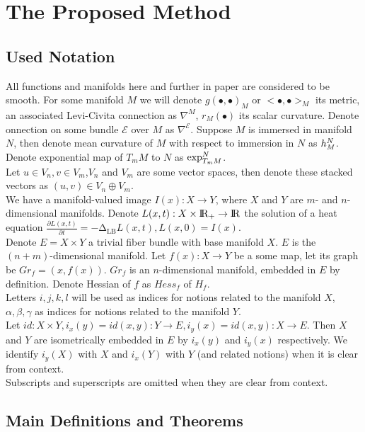 \documentclass{llncs}
\newcommand{\LaplaceBeltrami}{\mathrm{\Delta_{{LB}}}}
\newcommand{\partderiv}[2]{\frac{\partial #1}{\partial #2}}
\newcommand{\toreal}{\rightarrow\bbbr}
\newcommand{\CovariantDiffManif}[1]{\nabla^{#1}}
\newcommand{\TangentSpaceArg}[2]{{T_{#2}}{#1}}
\newcommand {\bigeps}{\mathcal{E}}
\begin{document}
\section{The Proposed Method}
\subsection{Used Notation}
All functions and manifolds here and further in paper are considered to be smooth. For some manifold $M$ we will denote $g(∙,∙)_{M}$ or $<∙,∙>_{M}$ its metric, an associated Levi-Civita connection as $\CovariantDiffManif{M}$, $r_M(∙)$ its scalar curvature. Denote onnection on some bundle $\bigeps$ over $M$ as $\CovariantDiffManif{\bigeps}$. Suppose $M$ is immersed in manifold $N$, then denote mean curvature of $M$ with respect to immersion in $N$ as $\tensor*{h}{^{N}_{M}}$. Denote exponential map of $\TangentSpaceArg{M}{m}$ to $N$ as $\tensor*{\exp}{^N_{\TangentSpaceArg{M}{m}}}$.
\\
Let $u \in V_n, v \in V_m$,$V_n$ and $V_m$ are some vector spaces, then denote these stacked vectors as $(u,v) \in V_n\oplus V_m$.
\\ 
We have a manifold-valued image $I(x):X \to Y$, where $X$ and $Y$ are $m$- and $n$-dimensional manifolds. Denote $L(x,t):X\times \bbbr_{+} \toreal$ the solution of a heat equation $\partderiv{L(x, t)}{t}=-\LaplaceBeltrami{ L(x, t)},L(x, 0)=I(x)$. 
\\
Denote $E=X\times Y$ a  trivial fiber bundle with base manifold $X$. $E$ is the $(n+m)$-dimensional manifold. Let $f(x):X\to Y$ be a some map, let its graph be $Gr_f=(x,f(x))$. $Gr_f$ is an $n$-dimensional manifold, embedded in $E$ by definition. Denote Hessian of $f$ as $Hess_f$ of $H_f$.
\\
Letters $i,j,k,l$ will be used as indices for notions related to the manifold $X$, $\alpha, \beta, \gamma$ as indices for notions related to the manifold $Y$.
\\
Let $id:X\times Y, i_x(y)=id(x, y):Y\to E, i_y(x)=id(x, y):X\to E$. Then $X$ and $Y$ are isometrically embedded in $E$ by $i_x(y)$ and $i_y(x)$ respectively. We identify $i_y(X)$ with $X$ and $i_x(Y)$ with $Y$ (and related notions) when it is clear from context.
\\
Subscripts and superscripts are omitted when they are clear from context.

\subsection{Main Definitions and Theorems}
\end{document}
